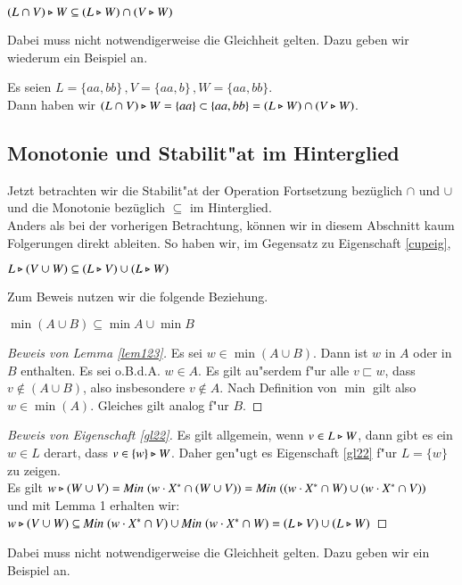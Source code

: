 \vspace{2ex}

\begin{eigen}
$(L\cap V) \triangleright W \subseteq (L\triangleright W) \cap (V\triangleright W)$
\end{eigen}
Dabei muss nicht notwendigerweise die Gleichheit gelten. Dazu geben wir wiederum ein Beispiel an.

\vspace{2ex}

\begin{beispiel}
Es seien $L= \{aa,bb\}\, ,V = \{aa,b\}\, ,W = \{aa,bb\}$. \\Dann haben wir $(L\cap V) \triangleright W = \{aa\} \subset \{aa,bb\} = (L\triangleright W) \cap (V\triangleright W)$.
\end{beispiel}

\subsection{Monotonie und Stabilit"at im Hinterglied}
Jetzt betrachten wir die Stabilit"at der Operation Fortsetzung bezüglich $\cap$ und $\cup$ und die Monotonie bezüglich $\subseteq$ im Hinterglied.\\
Anders als bei der vorherigen Betrachtung, können wir in diesem Abschnitt kaum Folgerungen direkt ableiten.
So haben wir, im Gegensatz zu Eigenschaft \ref{cupeig},

\vspace{2ex}

\begin{eigen}\label{gl22}
$L\triangleright (V\cup W)\subseteq (L\triangleright V) \cup (L\triangleright W)$
\end{eigen}
Zum Beweis nutzen wir die folgende Beziehung.

\vspace{2ex}

\begin{lem}\label{lem123}
$\min (A\cup B) \subseteq \min A \cup \min B$
\end{lem}

\begin{proof}[Beweis von Lemma \ref{lem123}]
Es sei $w\in \min (A\cup B)$. Dann ist $w$ in $A$ oder in $B$ enthalten. Es sei o.B.d.A. $w\in A$. Es gilt au"serdem f"ur alle $v\sqsubset w$, dass $v\notin (A\cup B)$, also insbesondere $v\notin A$. Nach Definition von $\min$ gilt also $w\in\min(A)$. Gleiches gilt analog f"ur $B$.
\end{proof}
\begin{proof}[Beweis von Eigenschaft \ref{gl22}]
Es gilt allgemein, wenn $v\in L\triangleright W$, dann gibt es ein $w\in L$ derart, dass $v\in \{w\}\triangleright W$. 
Daher gen"ugt es Eigenschaft \ref{gl22} f"ur $L=\{w\}$ zu zeigen.\\
Es gilt $w \triangleright (W\cup V)=\mathit{Min}\; (w\cdot X^* \cap (W\cup V)) =\mathit{Min}\; ((w\cdot X^* \cap W) \cup (w\cdot X^* \cap V))$\\
und mit Lemma 1 erhalten wir:\\
$ w\triangleright (V\cup W) \subseteq \mathit{Min}\; (w\cdot X^* \cap V) \cup \mathit{Min}\; (w\cdot X^* \cap W)=(L\triangleright V)\cup (L\triangleright W)$
\end{proof}
Dabei muss nicht notwendigerweise die Gleichheit gelten. Dazu geben wir ein Beispiel an.

